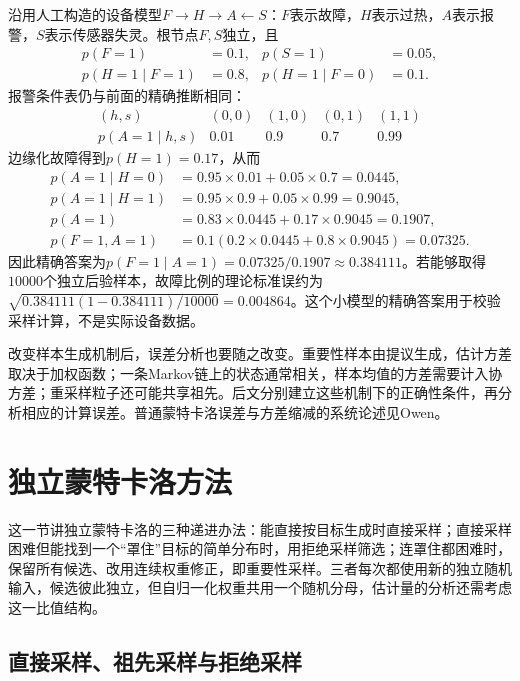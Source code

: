 \begin{example}[报警后的故障概率]
  \label{ex:pgm-sampling-device}
  沿用人工构造的设备模型$F\to H\to A\leftarrow S$：$F$表示故障，$H$表示过热，$A$表示报警，$S$表示传感器失灵。根节点$F,S$独立，且
  \[
    \begin{aligned}
      p(F=1)&=0.1,&p(S=1)&=0.05,\\
      p(H=1\mid F=1)&=0.8,&
      p(H=1\mid F=0)&=0.1.
    \end{aligned}
  \]
  报警条件表仍与前面的精确推断相同：
  \[
    \begin{array}{ccccc}
      (h,s)&(0,0)&(1,0)&(0,1)&(1,1)\\
      p(A=1\mid h,s)&0.01&0.9&0.7&0.99
    \end{array}
  \]
  边缘化故障得到$p(H=1)=0.17$，从而
  \[
    \begin{aligned}
      p(A=1\mid H=0)&=0.95\times0.01+0.05\times0.7=0.0445,\\
      p(A=1\mid H=1)&=0.95\times0.9+0.05\times0.99=0.9045,\\
      p(A=1)&=0.83\times0.0445+0.17\times0.9045=0.1907,\\
      p(F=1,A=1)&=0.1(0.2\times0.0445+0.8\times0.9045)=0.07325.
    \end{aligned}
  \]
  因此精确答案为$p(F=1\mid A=1)=0.07325/0.1907\approx0.384111$。若能够取得$10000$个独立后验样本，故障比例的理论标准误约为$\sqrt{0.384111(1-0.384111)/10000}=0.004864$。这个小模型的精确答案用于校验采样计算，不是实际设备数据。
\end{example}

改变样本生成机制后，误差分析也要随之改变。重要性样本由提议生成，估计方差取决于加权函数；一条Markov链上的状态通常相关，样本均值的方差需要计入协方差；重采样粒子还可能共享祖先。后文分别建立这些机制下的正确性条件，再分析相应的计算误差。普通蒙特卡洛误差与方差缩减的系统论述见Owen。

\section{独立蒙特卡洛方法}
\label{sec:pgm-sampling-independent}

这一节讲独立蒙特卡洛的三种递进办法：能直接按目标生成时直接采样；直接采样困难但能找到一个“罩住”目标的简单分布时，用拒绝采样筛选；连罩住都困难时，保留所有候选、改用连续权重修正，即重要性采样。三者每次都使用新的独立随机输入，候选彼此独立，但自归一化权重共用一个随机分母，估计量的分析还需考虑这一比值结构。

\subsection{直接采样、祖先采样与拒绝采样}
\label{sec:pgm-sampling-direct-rejection}

